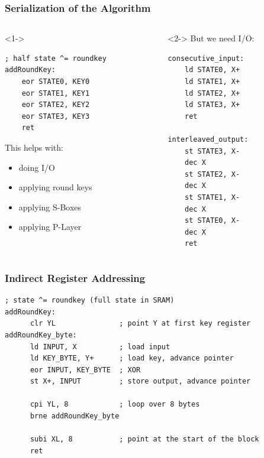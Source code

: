 \documentclass{beamer}
\begin{document}
\begin{frame}[fragile]
\frametitle{Serialization of the Algorithm}
\begin{columns}[t]
\begin{column}[t]{0.48\textwidth}<1->
\begin{lstlisting}
; half state ^= roundkey
addRoundKey:
    eor STATE0, KEY0
    eor STATE1, KEY1
    eor STATE2, KEY2
    eor STATE3, KEY3
    ret
\end{lstlisting}

This helps with:
\begin{itemize}
        \item doing I/O
        \item applying round keys
        \item applying S-Boxes
        \item applying P-Layer
\end{itemize}
\end{column}
\begin{column}[t]{0.48\textwidth}<2->
But we need I/O:
\begin{lstlisting}
consecutive_input:
    ld STATE0, X+
    ld STATE1, X+
    ld STATE2, X+
    ld STATE3, X+
    ret

interleaved_output:
    st STATE3, X-
    dec X
    st STATE2, X-
    dec X
    st STATE1, X-
    dec X
    st STATE0, X-
    dec X
    ret
\end{lstlisting}
\end{column}
\end{columns}
\end{frame}

\begin{frame}[fragile]
\frametitle{Indirect Register Addressing}
\begin{lstlisting}
; state ^= roundkey (full state in SRAM)
addRoundKey:
      clr YL               ; point Y at first key register
addRoundKey_byte:
      ld INPUT, X          ; load input
      ld KEY_BYTE, Y+      ; load key, advance pointer
      eor INPUT, KEY_BYTE  ; XOR
      st X+, INPUT         ; store output, advance pointer

      cpi YL, 8            ; loop over 8 bytes
      brne addRoundKey_byte

      subi XL, 8           ; point at the start of the block
      ret
\end{lstlisting}
\end{frame}
\end{document}
